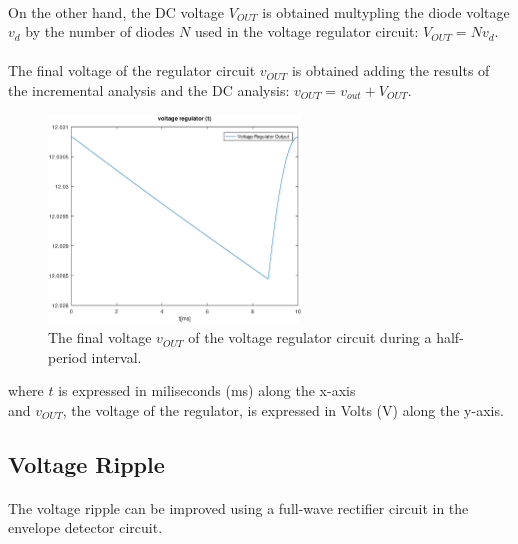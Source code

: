 \paragraph{}
On the other hand, the DC voltage $V_{OUT}$ is obtained multypling the diode voltage $v_d$ by the number of diodes $N$ used in the voltage regulator circuit: $V_{OUT}=N v_d$.

\paragraph{}
The final voltage of the regulator circuit $v_{OUT}$ is obtained adding the results of the incremental analysis and the DC analysis: $v_{OUT}=v_{out}+V_{OUT}$.

\begin{figure}[H] \centering
\includegraphics[width=0.6\textwidth]{output.eps}
\caption{The final voltage $v_{OUT}$ of the voltage regulator circuit during a half-period interval.}
\label{fig:output}
\end{figure}

where $t$ is expressed in miliseconds (ms) along the x-axis\\
and $v_{OUT}$, the voltage of the regulator, is expressed in Volts (V) along the y-axis.

\subsection{Voltage Ripple}
\label{subsec:ripple}

\paragraph{}
The voltage ripple can be improved using a full-wave rectifier circuit in the envelope detector circuit. 

